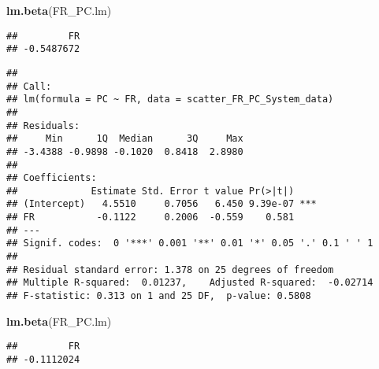 \documentclass[
]{article}
\newenvironment{Shaded}{\begin{snugshade}}{\end{snugshade}}
\newcommand{\CommentTok}[1]{\textcolor[rgb]{0.56,0.35,0.01}{\textit{#1}}}
\newcommand{\DataTypeTok}[1]{\textcolor[rgb]{0.13,0.29,0.53}{#1}}
\newcommand{\KeywordTok}[1]{\textcolor[rgb]{0.13,0.29,0.53}{\textbf{#1}}}
\newcommand{\NormalTok}[1]{#1}
\newcommand{\OperatorTok}[1]{\textcolor[rgb]{0.81,0.36,0.00}{\textbf{#1}}}
\newcommand{\StringTok}[1]{\textcolor[rgb]{0.31,0.60,0.02}{#1}}
\begin{document}
\begin{Shaded}
\begin{Highlighting}[]
\KeywordTok{lm.beta}\NormalTok{(FR_PC.lm)}
\end{Highlighting}
\end{Shaded}

\begin{verbatim}
##         FR 
## -0.5487672
\end{verbatim}

\begin{Shaded}
\end{Shaded}

\begin{verbatim}
## 
## Call:
## lm(formula = PC ~ FR, data = scatter_FR_PC_System_data)
## 
## Residuals:
##     Min      1Q  Median      3Q     Max 
## -3.4388 -0.9898 -0.1020  0.8418  2.8980 
## 
## Coefficients:
##             Estimate Std. Error t value Pr(>|t|)    
## (Intercept)   4.5510     0.7056   6.450 9.39e-07 ***
## FR           -0.1122     0.2006  -0.559    0.581    
## ---
## Signif. codes:  0 '***' 0.001 '**' 0.01 '*' 0.05 '.' 0.1 ' ' 1
## 
## Residual standard error: 1.378 on 25 degrees of freedom
## Multiple R-squared:  0.01237,    Adjusted R-squared:  -0.02714 
## F-statistic: 0.313 on 1 and 25 DF,  p-value: 0.5808
\end{verbatim}

\begin{Shaded}
\begin{Highlighting}[]
\KeywordTok{lm.beta}\NormalTok{(FR_PC.lm)}
\end{Highlighting}
\end{Shaded}

\begin{verbatim}
##         FR 
## -0.1112024
\end{verbatim}

\begin{Shaded}
\end{Shaded}
\end{document}

